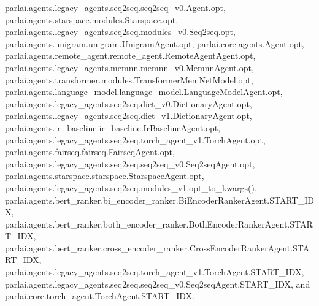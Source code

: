 parlai.\+agents.\+legacy\+\_\+agents.\+seq2seq.\+seq2seq\+\_\+v0.\+Agent.\+opt, parlai.\+agents.\+starspace.\+modules.\+Starspace.\+opt, parlai.\+agents.\+legacy\+\_\+agents.\+seq2seq.\+modules\+\_\+v0.\+Seq2seq.\+opt, parlai.\+agents.\+unigram.\+unigram.\+Unigram\+Agent.\+opt, parlai.\+core.\+agents.\+Agent.\+opt, parlai.\+agents.\+remote\+\_\+agent.\+remote\+\_\+agent.\+Remote\+Agent\+Agent.\+opt, parlai.\+agents.\+legacy\+\_\+agents.\+memnn.\+memnn\+\_\+v0.\+Memnn\+Agent.\+opt, parlai.\+agents.\+transformer.\+modules.\+Transformer\+Mem\+Net\+Model.\+opt, parlai.\+agents.\+language\+\_\+model.\+language\+\_\+model.\+Language\+Model\+Agent.\+opt, parlai.\+agents.\+legacy\+\_\+agents.\+seq2seq.\+dict\+\_\+v0.\+Dictionary\+Agent.\+opt, parlai.\+agents.\+legacy\+\_\+agents.\+seq2seq.\+dict\+\_\+v1.\+Dictionary\+Agent.\+opt, parlai.\+agents.\+ir\+\_\+baseline.\+ir\+\_\+baseline.\+Ir\+Baseline\+Agent.\+opt, parlai.\+agents.\+legacy\+\_\+agents.\+seq2seq.\+torch\+\_\+agent\+\_\+v1.\+Torch\+Agent.\+opt, parlai.\+agents.\+fairseq.\+fairseq.\+Fairseq\+Agent.\+opt, parlai.\+agents.\+legacy\+\_\+agents.\+seq2seq.\+seq2seq\+\_\+v0.\+Seq2seq\+Agent.\+opt, parlai.\+agents.\+starspace.\+starspace.\+Starspace\+Agent.\+opt, parlai.\+agents.\+legacy\+\_\+agents.\+seq2seq.\+modules\+\_\+v1.\+opt\+\_\+to\+\_\+kwargs(), parlai.\+agents.\+bert\+\_\+ranker.\+bi\+\_\+encoder\+\_\+ranker.\+Bi\+Encoder\+Ranker\+Agent.\+S\+T\+A\+R\+T\+\_\+\+I\+DX, parlai.\+agents.\+bert\+\_\+ranker.\+both\+\_\+encoder\+\_\+ranker.\+Both\+Encoder\+Ranker\+Agent.\+S\+T\+A\+R\+T\+\_\+\+I\+DX, parlai.\+agents.\+bert\+\_\+ranker.\+cross\+\_\+encoder\+\_\+ranker.\+Cross\+Encoder\+Ranker\+Agent.\+S\+T\+A\+R\+T\+\_\+\+I\+DX, parlai.\+agents.\+legacy\+\_\+agents.\+seq2seq.\+torch\+\_\+agent\+\_\+v1.\+Torch\+Agent.\+S\+T\+A\+R\+T\+\_\+\+I\+DX, parlai.\+agents.\+legacy\+\_\+agents.\+seq2seq.\+seq2seq\+\_\+v0.\+Seq2seq\+Agent.\+S\+T\+A\+R\+T\+\_\+\+I\+DX, and parlai.\+core.\+torch\+\_\+agent.\+Torch\+Agent.\+S\+T\+A\+R\+T\+\_\+\+I\+DX.

